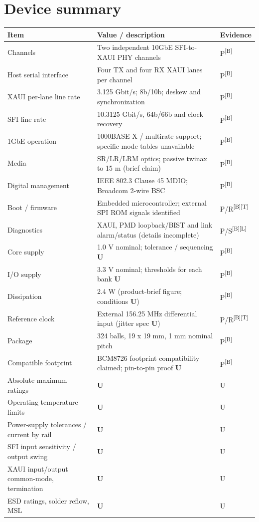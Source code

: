 \documentclass[10pt,a4paper]{article}
\newcommand{\unk}{\textsf{\color{amber}\bfseries U}}
\newcommand{\src}[1]{\textsuperscript{[#1]}}
\begin{document}
\section{Device summary}
\begin{tabularx}{\linewidth}{@{}p{58mm}Xl@{}}\toprule
Item & Value / description & Evidence\\\midrule
Channels & Two independent 10GbE SFI-to-XAUI PHY channels & P\src{B}\\
Host serial interface & Four TX and four RX XAUI lanes per channel & P\src{B}\\
XAUI per-lane line rate & 3.125 Gbit/s; 8b/10b; deskew and synchronization & P\src{B}\\
SFI line rate & 10.3125 Gbit/s, 64b/66b and clock recovery & P\src{B}\\
1GbE operation & 1000BASE-X / multirate support; specific mode tables unavailable & P\src{B}\\
Media & SR/LR/LRM optics; passive twinax to 15 m (brief claim) & P\src{B}\\
Digital management & IEEE 802.3 Clause 45 MDIO; Broadcom 2-wire BSC & P\src{B}\\
Boot / firmware & Embedded microcontroller; external SPI ROM signals identified & P/R\src{B}\src{T}\\
Diagnostics & XAUI, PMD loopback/BIST and link alarm/status (details incomplete) & P/S\src{B}\src{L}\\
Core supply & 1.0 V nominal; tolerance / sequencing \unk & P\src{B}\\
I/O supply & 3.3 V nominal; thresholds for each bank \unk & P\src{B}\\
Dissipation & 2.4 W (product-brief figure; conditions \unk) & P\src{B}\\
Reference clock & External 156.25 MHz differential input (jitter spec \unk) & P/R\src{B}\src{T}\\
Package & 324 balls, 19 x 19 mm, 1 mm nominal pitch & P\src{B}\\
Compatible footprint & BCM8726 footprint compatibility claimed; pin-to-pin proof \unk & P\src{B}\\
Absolute maximum ratings & \unk & U\\
Operating temperature limits & \unk & U\\
Power-supply tolerances / current by rail & \unk & U\\
SFI input sensitivity / output swing & \unk & U\\
XAUI input/output common-mode, termination & \unk & U\\
ESD ratings, solder reflow, MSL & \unk & U\\
\bottomrule\end{tabularx}
\end{document}
